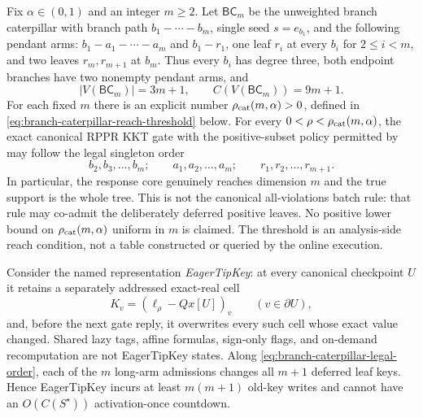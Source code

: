 \begin{proposition}
\label{prop:branch-caterpillar-eager-rekey-obstruction}
Fix $\alpha\in(0,1)$ and an integer $m\geq2$.  Let
$\mathsf{BC}_m$ be the unweighted branch caterpillar with branch path
$b_1-\cdots-b_m$, single seed $s=e_{b_1}$, and the following pendant arms:
$b_1-a_1-\cdots-a_m$ and $b_1-r_1$, one leaf $r_i$ at every
$b_i$ for $2\leq i<m$, and two leaves $r_m,r_{m+1}$ at $b_m$.
Thus every $b_i$ has degree three, both endpoint branches have two nonempty
pendant arms, and
\begin{equation}
 |V(\mathsf{BC}_m)|=3m+1,
 \qquad C(V(\mathsf{BC}_m))=9m+1.
 \label{eq:branch-caterpillar-size}
\end{equation}
For each fixed $m$ there is an explicit number
$\rho_{\rm cat}(m,\alpha)>0$, defined in
\eqref{eq:branch-caterpillar-reach-threshold} below.  For every
$0<\rho<\rho_{\rm cat}(m,\alpha)$, the exact canonical RPPR KKT gate with the
positive-subset policy permitted by  may
follow the legal singleton order
\begin{equation}
 b_2,b_3,\ldots,b_m;\qquad
 a_1,a_2,\ldots,a_m;\qquad
 r_1,r_2,\ldots,r_{m+1}.
 \label{eq:branch-caterpillar-legal-order}
\end{equation}
In particular, the response core genuinely reaches dimension $m$ and the
true support is the whole tree.  This is not the canonical all-violations
batch rule: that rule may co-admit the deliberately deferred positive leaves.
No positive lower bound on $\rho_{\rm cat}(m,\alpha)$ uniform in $m$ is
claimed.  The threshold is an analysis-side reach condition, not a table
constructed or queried by the online execution.

Consider the named representation \emph{EagerTipKey}: at every canonical
checkpoint $U$ it retains a separately addressed exact-real cell
\begin{equation*}
 K_v=(\ell_\rho-Qx[U])_v
 \qquad(v\in\partial U),
\end{equation*}
and, before the next gate reply, it overwrites every such cell whose exact
value changed.  Shared lazy tags, affine formulas, sign-only flags, and
on-demand recomputation are not EagerTipKey states.  Along
\eqref{eq:branch-caterpillar-legal-order}, each of the $m$ long-arm admissions
changes all $m+1$ deferred leaf keys.  Hence EagerTipKey incurs at least
$m(m+1)$ old-key writes and cannot have an $O(C(S^\star))$ activation-once
countdown.


\end{proposition}

